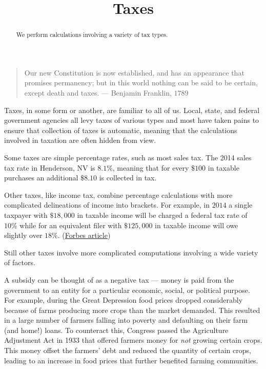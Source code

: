 \documentclass{ximera}
\title{Taxes}
\begin{document}
\begin{abstract}
We perform calculations involving a variety of tax types.
\end{abstract}
\maketitle
\begin{quote}
Our new Constitution is now established, and has an appearance that promises permanency; but in this world nothing can be said to be certain, except death and taxes. --- Benjamin Franklin, $1789$
\end{quote}

Taxes, in some form or another, are familiar to all of us. Local, state, and federal government agencies all levy taxes of various types and most have taken pains to ensure that collection of taxes is automatic, meaning that the calculations involved in taxation are often hidden from view.

Some taxes are simple percentage rates, such as most sales tax. The 2014 sales tax rate in Henderson, NV is $8.1\%$, meaning that for every $\$100$ in taxable purchases an additional $\$8.10$ is collected in tax.

Other taxes, like income tax, combine percentage calculations with more complicated delineations of income into brackets. For example, in $2014$ a single taxpayer with $\$18,000$ in taxable income will be charged a federal tax rate of $10\%$ while for an equivalent filer with $\$125,000$ in taxable income will owe slightly over $18\%$. (\href{http://www.forbes.com/sites/kellyphillipserb/2013/10/31/irs-announces-2014-tax-brackets-standard-deduction-amounts-and-more/}{Forbes article})

Still other taxes involve more complicated computations involving a wide variety of factors. 

A subsidy can be thought of as a negative tax --- money is paid from the government to an entity for a particular economic, social, or political purpose. For example, during the Great Depression food prices dropped considerably because of farms producing more crops than the market demanded. This resulted in a large number of farmers falling into poverty and defaulting on their farm (and home!) loans. To counteract this, Congress passed the Agriculture Adjustment Act in 1933 that offered farmers money for \emph{not} growing certain crops. This money offset the farmers' debt and reduced the quantity of certain crops, leading to an increase in food prices that further benefited farming communities.
\end{document}
